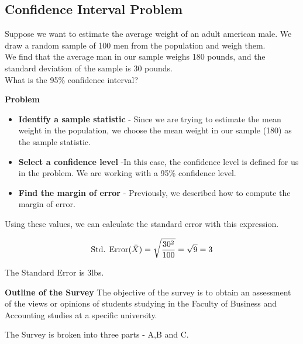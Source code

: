\documentclass[]{report}
\begin{document}
\subsection{Confidence Interval Problem}

Suppose we want to estimate the average weight of an adult american male. We draw a random sample of 100 men from the population  and weigh them.\\ \vspace{0.3cm} We find that the average man in our sample weighs 180 pounds, and the standard deviation of the sample is 30 pounds.\\ What is the 95\% confidence interval?



\noindent  \textbf{Problem}

\begin{itemize}
	\item
	\textbf{Identify a sample statistic} - Since we are trying to estimate the mean weight in the population, we choose the mean weight in our sample (180) as the sample statistic.
	
	
	\item \textbf{Select a confidence level}  -In this case, the confidence level is defined for us in the problem. We are working with a 95\% confidence level.
	
	
	\item \textbf{Find the margin of error} - Previously, we described how to compute the margin of error.
\end{itemize}





Using these values, we can calculate the standard error with this expression.

\vspace{0.1cm}
\[
\mbox{Std. Error}(\bar{X})  = \sqrt{{30^2\over 100}} = \sqrt{9}
= 3\]

\vspace{0.1cm}

The Standard Error is 3lbs.



\noindent  \textbf{Outline of the Survey}
The objective of the survey is to obtain an assessment of the views or opinions of students studying in the Faculty of Business and Accounting studies at a specific university.

\vspace{0.4cm}

The Survey is broken into three parts - A,B and C. \\ \vspace{0.2cm}
\end{document}
